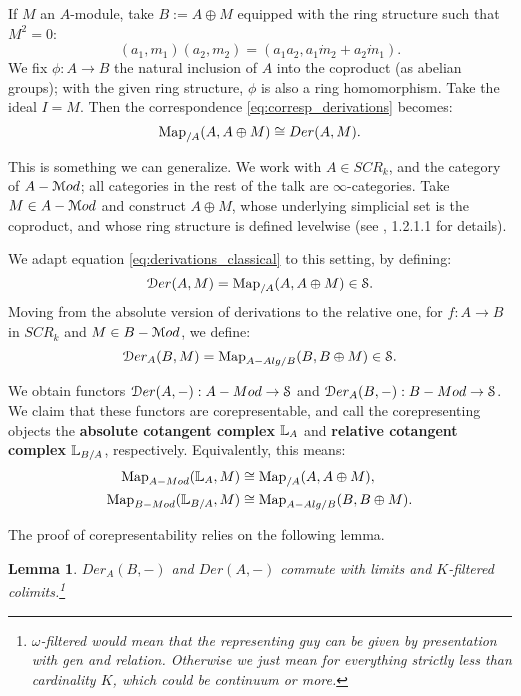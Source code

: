 \documentclass[10pt,a4paper,reqno,oneside]{book} %
\theoremstyle{plain}
\newtheorem{lem}[thm]{Lemma}
\theoremstyle{definition}
\theoremstyle{remark}
\numberwithin{equation}{section}
\begin{document}
If $M$ an $A$-module, take $B := A \oplus M$ equipped with 
the ring structure such that $M^2 = 0$:
\[	(a_1, m_1) (a_2,m_2) = (a_1 a_2, a_1 \dot m_2 + a_2\dot m_1).	\]
We fix $\phi : A \to B$ the natural inclusion of $A$ into the coproduct (as abelian groups); with the given ring structure,
$\phi$ is also a ring homomorphism. Take the ideal $I = M$. Then the correspondence \ref{eq:corresp_derivations} becomes:
\begin{equation}
\label{eq:derivations_classical}
\operatorname{Map}_{/A}(A, A\oplus M) \cong Der(A,M).
\end{equation}


This is something we can generalize. We work with $A \in SCR_k$, and the category of $A-\mathcal M od$; all categories in the rest of
the talk are $\infty$-categories. Take $M \in A-\mathcal M od$ and construct $A \oplus M$, whose underlying simplicial set is the
coproduct, and whose ring structure is defined levelwise (see \cite{HAG-II}, 1.2.1.1 for details).

We adapt equation \ref{eq:derivations_classical} to this setting, by defining:
\[	\mathcal D er(A,M) = \operatorname{Map}_{/A}(A,A\oplus M) \in \mathcal S.	\]
Moving from the absolute version of derivations to the relative one, for $f : A \to B$ in $SCR_k$ and $M \in B-\mathcal M od$, we 
define: 
\[	\mathcal D er_A (B,M) = \operatorname{Map}_{A-Alg/B}(B, B\oplus M)\in \mathcal S.	\]


We obtain functors $\mathcal D er(A,-) : A-Mod \to \mathcal S$ and $\mathcal D er_A(B,-) : B-Mod \to \mathcal S$. We claim that these functors are corepresentable,
and call the corepresenting objects the \textbf{absolute cotangent complex} $\mathbb L_A$ and \textbf{relative cotangent complex}
$\mathbb L_{B/A}$, respectively. Equivalently, this means:
\begin{align*}
\operatorname{Map}_{A-Mod}(\mathbb L_{A}, M) &\cong \operatorname{Map}_{/A}(A, A\oplus M), \\
\operatorname{Map}_{B-Mod}(\mathbb L_{B/A}, M) &\cong \operatorname{Map}_{A-Alg/B}(B, B\oplus M).
\end{align*}

The proof of corepresentability relies on the following lemma.
\begin{lem}
\item $Der_A(B,-)$ and $Der(A,-)$ commute with limits and $K$-filtered colimits.\footnote{
$\omega$-filtered would mean that the representing guy can be given by presentation with gen and relation. Otherwise we just
mean for everything strictly less than cardinality $K$, which could be continuum or more.} 
\end{lem}
\end{document}
